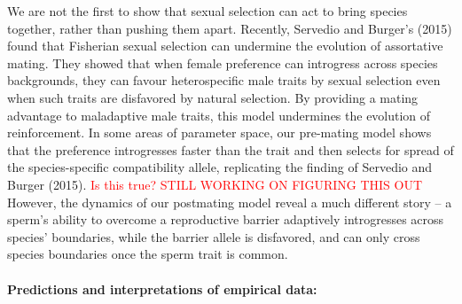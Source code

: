 \documentclass[11pt]{article}
\begin{document}
We are not the first to show that sexual selection can act to  bring species together, rather than pushing them apart. 
Recently, Servedio and Burger's (2015) found that Fisherian sexual selection can undermine the evolution of assortative mating.
They showed that when female preference can introgress across  species backgrounds, they can favour heterospecific male traits by sexual selection even when such traits are disfavored by natural selection.   
By  providing a mating advantage to maladaptive male traits, this model undermines the evolution of reinforcement.  
In some areas of parameter space, our pre-mating model shows that the preference introgresses faster than the trait and then selects for spread of the species-specific compatibility allele, replicating the finding of Servedio and Burger (2015).  \textcolor{red}{Is this true? STILL WORKING ON FIGURING THIS OUT}  
However, the dynamics of our postmating model reveal a much different story -- a sperm's ability to overcome a reproductive barrier adaptively introgresses across species' boundaries, while the barrier allele is disfavored, and can only cross species boundaries once the sperm trait is common. \



\paragraph{Predictions and interpretations of empirical data:}      
\end{document}
